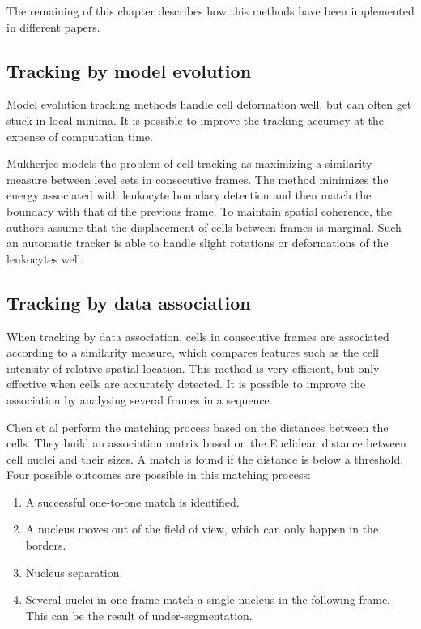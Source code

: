 \documentclass[12pt,a4paper,openany]{book}
\begin{document}
The remaining of this chapter describes how this methods have been implemented in different papers.

\subsection{Tracking by model evolution}

Model evolution tracking methods handle cell deformation well, but can often get stuck in local minima. It is possible to improve the tracking accuracy at the expense of computation time.

Mukherjee \cite{mukherjee04} models the problem of cell tracking as maximizing a similarity measure between level sets in consecutive frames. The method minimizes the energy associated with leukocyte boundary detection and then match the boundary with that of the previous frame. To maintain spatial coherence, the authors assume that the displacement of cells between frames is marginal. Such an automatic tracker is able to handle slight rotations or deformations of the leukocytes well.

\subsection{Tracking by data association}

When tracking by data association, cells in consecutive frames are associated according to a similarity measure, which compares features such as the cell intensity of relative spatial location. This method is very efficient, but only effective when cells are accurately detected. It is possible to improve the association by analysing several frames in a sequence.

Chen et al \cite{chen06} perform the matching process based on the distances between the cells. They build an association matrix based on the Euclidean distance between cell nuclei and their sizes. A match is found if the distance is below a threshold. Four possible outcomes are possible in this matching process:

\begin{enumerate}
	\item A successful one-to-one match is identified.
	\item A nucleus moves out of the field of view, which can only happen in the borders.
	\item Nucleus separation.
	\item Several nuclei in one frame match a single nucleus in the following frame. This can be the result of under-segmentation.
\end{enumerate}
\end{document}
